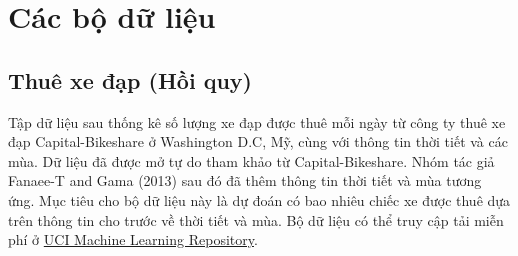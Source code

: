 
\chapter{Các bộ dữ liệu}
\section{Thuê xe đạp (Hồi quy)}\label{chap_3.1}
Tập dữ liệu sau thống kê số lượng xe đạp được thuê mỗi ngày từ công ty thuê xe đạp Capital-Bikeshare ở Washington D.C, Mỹ, cùng với thông tin thời tiết và các mùa. Dữ liệu đã được mở tự do tham khảo từ Capital-Bikeshare. Nhóm tác giả Fanaee-T and Gama (2013) sau đó đã thêm thông tin thời tiết và mùa tương ứng. Mục tiêu cho bộ dữ liệu này là dự đoán có bao nhiêu chiếc xe được thuê dựa trên thông tin 
cho trước về thời tiết và mùa. Bộ dữ liệu có thể truy cập tải miễn phí ở \href{http://archive.ics.uci.edu/ml/datasets/Bike+Sharing+Dataset}{UCI Machine Learning Repository}. 

